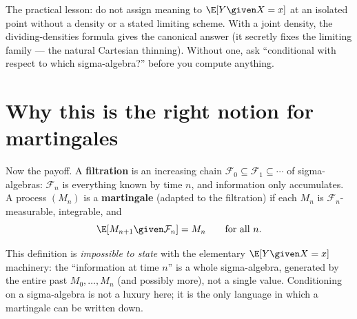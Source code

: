\begin{trapbox}
The practical lesson: do not assign meaning to $\E[Y\given X = x]$ at an isolated point without a
density or a stated limiting scheme. With a joint density, the dividing-densities formula gives the
canonical answer (it secretly fixes the limiting family --- the natural Cartesian thinning). Without
one, ask ``conditional with respect to which sigma-algebra?'' before you compute anything.
\end{trapbox}

\section{Why this is the right notion for martingales}
\label{ch38:martingales}

Now the payoff. A \textbf{filtration} is an increasing chain $\mathcal{F}_0 \subseteq \mathcal{F}_1
\subseteq \cdots$ of sigma-algebras: $\mathcal{F}_n$ is everything known by time $n$, and information
only accumulates. A process $(M_n)$ is a \textbf{martingale} (adapted to the filtration) if each $M_n$
is $\mathcal{F}_n$-measurable, integrable, and
\begin{equation}
\label{ch38:martingale-def}
  \E[M_{n+1} \given \mathcal{F}_n] = M_n \qquad \text{for all } n.
\end{equation}

This definition is \emph{impossible to state} with the elementary $\E[Y\given X = x]$ machinery: the
``information at time $n$'' is a whole sigma-algebra, generated by the entire past $M_0, \dots, M_n$
(and possibly more), not a single value. Conditioning on a sigma-algebra is not a luxury here; it is
the only language in which a martingale can be written down.

